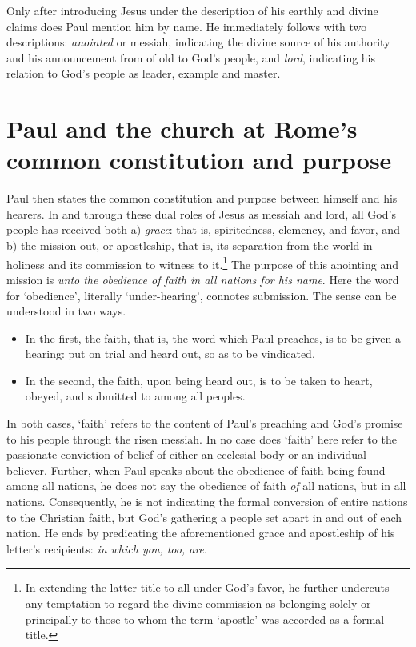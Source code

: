 Only after introducing Jesus under the description of his earthly and divine claims does Paul mention him by name. He immediately follows with two descriptions: \emph{anointed} or messiah, indicating the divine source of his authority and his announcement from of old to God's people, and \emph{lord}, indicating his relation to God's people as leader, example and master. 


\section{Paul and the church at Rome's common constitution and purpose}
Paul then states the common constitution and purpose between himself and his hearers. In and through these dual roles of Jesus as messiah and lord, all God's people has received both a) \emph{grace}: that is, spiritedness, clemency, and favor, and b) the mission out, or apostleship, that is, its separation from the world in holiness and its commission to witness to it.\footnote{In extending the latter title to all under God's favor, he further undercuts any temptation to regard the divine commission as belonging solely or principally to those to whom the term `apostle' was accorded as a formal title.} The purpose of this anointing and mission is \emph{unto the obedience of faith in all nations for his name}. Here the word for `obedience', literally `under-hearing', connotes submission. The sense can be understood in two ways. 
\begin{itemize}
	\item In the first, the faith, that is, the word which Paul preaches, is to be given a hearing: put on trial and heard out, so as to be vindicated.
	\item In the second, the faith, upon being heard out, is to be taken to heart, obeyed, and submitted to among all peoples.
\end{itemize}

In both cases, `faith' refers to the content of Paul's preaching and God's promise to his people through the risen messiah. In no case does `faith' here refer to the passionate conviction of belief of either an ecclesial body or an individual believer. Further, when Paul speaks about the obedience of faith being found among all nations, he does not say the obedience of faith \emph{of} all nations, but {in} all nations. Consequently, he is not indicating the formal conversion of entire nations to the Christian faith, but God's gathering a people set apart in and out of each nation. He ends by predicating the aforementioned grace and apostleship of his letter's recipients: \emph{in which you, too, are}.

